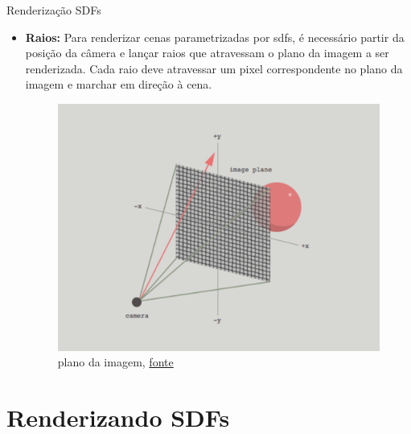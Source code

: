 \documentclass[2pt]{beamer} %
\begin{document}
\begin{frame}{Renderização SDFs}


\begin{itemize}
    \item \textbf{Raios:} Para renderizar cenas parametrizadas por sdfs, é necessário partir da posição da câmera e lançar raios que atravessam o plano da imagem a ser renderizada. Cada raio deve atravessar um pixel correspondente no plano da imagem e marchar em direção à cena.

    \begin{figure}
        \centering
        \includegraphics[width=0.5\linewidth]{imgs/image_plane.png}
        \caption{plano da imagem, \href{https://michaelwalczyk.com/blog-ray-marching.html}{fonte}}
        \label{fig:enter-label}
    \end{figure}

\end{itemize}


\end{frame}

\section{Renderizando SDFs}
\end{document}
